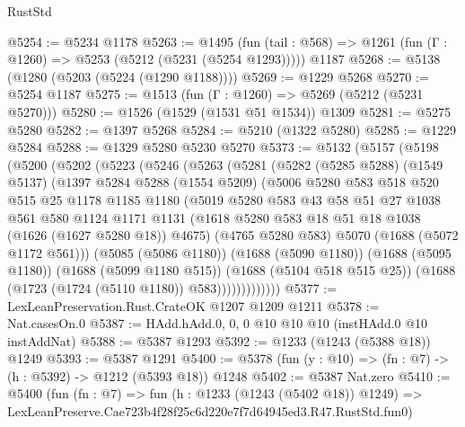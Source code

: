 \begin{lexlean}{RustStd}
\begin{coremodule}
@5254 := @5234 @1178
@5263 := @1495
    (fun (tail : @568) => @1261 (fun (Γ : @1260) => @5253 (@5212 (@5231 (@5254 @1293)))))
    @1187
@5268 := @5138 (@1280 (@5203 (@5224 (@1290 @1188))))
@5269 := @1229 @5268
@5270 := @5254 @1187
@5275 := @1513 (fun (Γ : @1260) => @5269 (@5212 (@5231 @5270)))
@5280 := @1526 (@1529 (@1531 @51 @1534)) @1309
@5281 := @5275 @5280
@5282 := @1397 @5268
@5284 := @5210 (@1322 @5280)
@5285 := @1229 @5284
@5288 := @1329 @5280 @5230 @5270
@5373 := @5132
    (@5157
      (@5198
        (@5200
          (@5202
            (@5223
              (@5246
                (@5263
                  (@5281
                    (@5282
                      (@5285 @5288)
                      (@1549 @5137)
                      (@1397
                        @5284
                        @5288
                        (@1554 @5209)
                        (@5006
                          @5280
                          @583
                          @518
                          @520
                          @515
                          @25
                          @1178
                          @1185
                          @1180
                          (@5019
                            @5280
                            @583
                            @43
                            @58
                            @51
                            @27
                            @1038
                            @561
                            @580
                            @1124
                            @1171
                            @1131
                            (@1618 @5280 @583 @18 @51 @18 @1038 (@1626 (@1627 @5280 @18)) @4675)
                            (@4765 @5280 @583)
                            @5070
                            (@1688 (@5072 @1172 @561)))
                          (@5085 (@5086 @1180))
                          (@1688 (@5090 @1180))
                          (@1688 (@5095 @1180))
                          (@1688 (@5099 @1180 @515))
                          (@1688 (@5104 @518 @515 @25))
                          (@1688 (@1723 (@1724 (@5110 @1180)) @583)))))))))))))
@5377 := LexLeanPreservation.Rust.CrateOK @1207 @1209 @1211
@5378 := Nat.casesOn.{0}
@5387 := HAdd.hAdd.{0, 0, 0} @10 @10 @10 (instHAdd.{0} @10 instAddNat)
@5388 := @5387 @1293
@5392 := @1233 (@1243 (@5388 @18)) @1249
@5393 := @5387 @1291
@5400 := @5378 (fun (y : @10) => (fn : @7) -> (h : @5392) -> @1212 (@5393 @18)) @1248
@5402 := @5387 Nat.zero
@5410 := @5400
    (fun (fn : @7) =>
    fun (h : @1233 (@1243 (@5402 @18)) @1249) =>
    LexLeanPreserve.Cae723b4f28f25c6d220e7f7d64945ed3.R47.RustStd.fun0)

\end{coremodule}
\end{lexlean}
